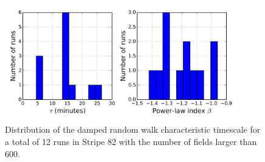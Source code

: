 \begin{figure}
\centering
\includegraphics[width=0.9\textwidth]{FIGURES/hist.png}
\caption{Distribution of the damped random walk characteristic
  timescale for a total of 12 runs in Stripe 82 with the number of
  fields larger than 600.
\label{fig:hist}}
\end{figure}

